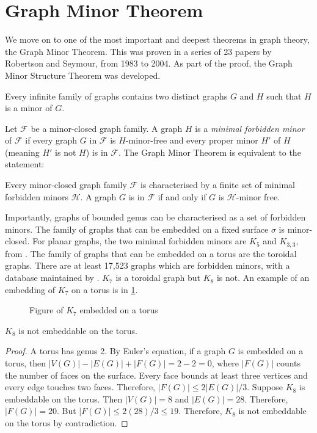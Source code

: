 \section{Graph Minor Theorem}\label{sec:Graph Minor Theorem}
We move on to one of the most important and deepest theorems in graph theory, the Graph Minor Theorem. This was proven in a series of 23 papers by Robertson and Seymour, from 1983 to 2004. As part of the proof, the Graph Minor Structure Theorem was developed. 
\begin{theorem}
	Every infinite family of graphs contains two distinct graphs \(G\) and \(H\) such that \(H\) is a minor of \(G\).
\end{theorem}
Let $\mathcal{F}$ be a minor-closed graph family. A graph $H$ is a \textit{minimal forbidden minor} of $\mathcal{F}$ if every graph $G$ in $\mathcal{F}$ is $H$-minor-free and every proper minor $H'$ of $H$ (meaning $H'$ is not $H$) is in $\mathcal{F}$. 
The Graph Minor Theorem is equivalent to the statement:
\begin{theorem}
	Every minor-closed graph family $\mathcal{F}$ is characterised by a finite set of minimal forbidden minors $\mathcal{H}$. A graph $G$ is in $\mathcal{F}$ if and only if $G$ is $\mathcal{H}$-minor free.
\end{theorem}
Importantly, graphs of bounded genus can be characterised as a set of forbidden minors. The family of graphs that can be embedded on a fixed surface $\sigma$ is minor-closed. 
For planar graphs, the two minimal forbidden minors are \(K_5\) and \(K_{3,3}\), from \textcite{wagnerUeberEigenschaftEbenen1937}. 
The family of graphs that can be embedded on a torus are the toroidal graphs. There are at least 17,523 graphs which are forbidden minors, with a database maintained by \textcite{myrvoldLargeSetTorus2018}. $K_7$ is a toroidal graph but $K_8$ is not. An example of an embedding of $K_7$ on a torus is in \cref{fig:k7_on_torus}.

\begin{figure}[h!]
	\centering
	
	\caption{Figure of $K_7$ embedded on a torus}\label{fig:k7_on_torus}
\end{figure}

\begin{lemma}
	$K_8$ is not embeddable on the torus.
\end{lemma}
\begin{proof}
	A torus has genus 2. By Euler's equation, if a graph $G$ is embedded on a torus, then $|V(G)| - |E(G)| + |F(G)| = 2 - 2 = 0$, where $|F(G)|$ counts the number of faces on the surface. Every face bounds at least three vertices and every edge touches two faces. Therefore, $|F(G)| \leq 2|E(G)|/3$. Suppose $K_8$ is embeddable on the torus. Then $|V(G)| = 8$ and $|E(G)| = 28$. Therefore, $|F(G)| = 20$. But $|F(G)| \leq 2 (28)/3 \leq 19$. Therefore, $K_8$ is not embeddable on the torus by contradiction.
\end{proof}

